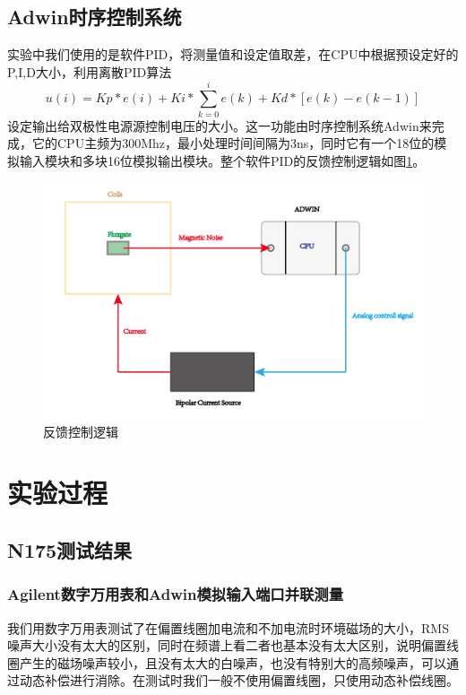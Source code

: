 \documentclass[onecolumn,a4paper,10pt]{article}
\begin{document}
\subsection{Adwin时序控制系统}
实验中我们使用的是软件PID，将测量值和设定值取差，在CPU中根据预设定好的P,I,D大小，利用离散PID算法\begin{equation}
u(i)=Kp*e(i)+Ki*\sum_{k=0}^{i}e(k)+Kd*[e(k)-e(k-1)]
\end{equation}
设定输出给双极性电源源控制电压的大小。这一功能由时序控制系统Adwin来完成，它的CPU主频为300Mhz，最小处理时间间隔为3ns，同时它有一个18位的模拟输入模块和多块16位模拟输出模块。整个软件PID的反馈控制逻辑如图\ref{fig1:PID}。

\begin{figure}[htbp]
\centering
\includegraphics[width=6in]{PIDMAG}
\caption{反馈控制逻辑}
\label{fig1:PID}
\end{figure}


\section{实验过程}
\subsection{N175测试结果}
\subsubsection{Agilent数字万用表和Adwin模拟输入端口并联测量}
我们用数字万用表测试了在偏置线圈加电流和不加电流时环境磁场的大小，RMS噪声大小没有太大的区别，同时在频谱上看二者也基本没有太大区别，说明偏置线圈产生的磁场噪声较小，且没有太大的白噪声，也没有特别大的高频噪声，可以通过动态补偿进行消除。在测试时我们一般不使用偏置线圈，只使用动态补偿线圈。
\end{document}
